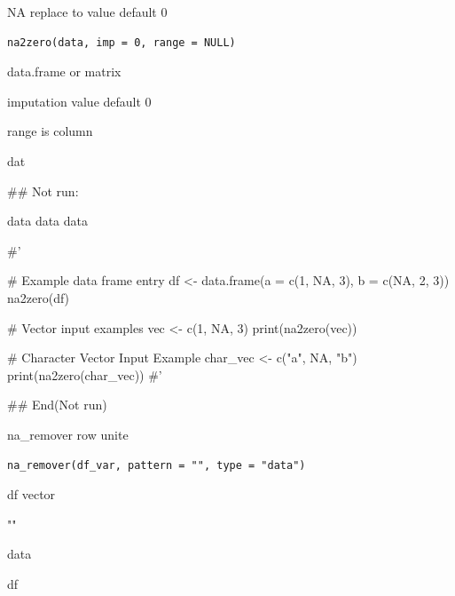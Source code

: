 \documentclass[a4paper]{book}
\begin{document}
%
\begin{Description}
NA replace to value default 0
\end{Description}
%
\begin{Usage}
\begin{verbatim}
na2zero(data, imp = 0, range = NULL)
\end{verbatim}
\end{Usage}
%
\begin{Arguments}
\begin{ldescription}
\item[\code{data}] data.frame or matrix

\item[\code{imp}] imputation value default 0

\item[\code{range}] range is column
\end{ldescription}
\end{Arguments}
%
\begin{Value}
dat
\end{Value}
%
\begin{Examples}
\begin{ExampleCode}

\#\# Not run: 

data %
data %
data %

#'

# Example data frame entry
df <- data.frame(a = c(1, NA, 3), b = c(NA, 2, 3))
na2zero(df)

# Vector input examples
vec <- c(1, NA, 3)
print(na2zero(vec))

# Character Vector Input Example
char_vec <- c("a", NA, "b")
print(na2zero(char_vec))
#'


## End(Not run)

\end{ExampleCode}
\end{Examples}

%
\begin{Description}
na\_remover row unite
\end{Description}
%
\begin{Usage}
\begin{verbatim}
na_remover(df_var, pattern = "", type = "data")
\end{verbatim}
\end{Usage}
%
\begin{Arguments}
\begin{ldescription}
\item[\code{df\_var}] df vector

\item[\code{pattern}] ""

\item[\code{type}] data
\end{ldescription}
\end{Arguments}
%
\begin{Value}
df
\end{Value}
\end{document}
